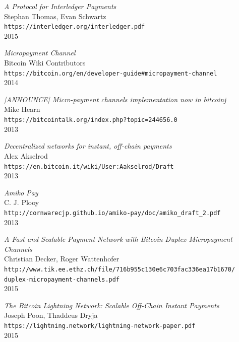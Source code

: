 \documentclass[a4paper]{article}
\begin{document}
\pagebreak

\printglossaries

\begin{thebibliography}{99}

\emph{A Protocol for Interledger Payments}\\
Stephan Thomas, Evan Schwartz\\
\texttt{https://interledger.org/interledger.pdf}\\
2015

\emph{Micropayment Channel}\\
Bitcoin Wiki Contributors\\
\texttt{https://bitcoin.org/en/developer-guide\#micropayment-channel}\\
2014

\emph{[ANNOUNCE] Micro-payment channels implementation now in bitcoinj}\\
Mike Hearn\\
\texttt{https://bitcointalk.org/index.php?topic=244656.0}\\
2013

\emph{Decentralized networks for instant, off-chain payments}\\
Alex Akselrod\\
\texttt{https://en.bitcoin.it/wiki/User:Aakselrod/Draft}\\
2013

\emph{Amiko Pay}\\
C. J. Plooy\\
\texttt{http://cornwarecjp.github.io/amiko-pay/doc/amiko\_draft\_2.pdf}\\
2013

\emph{A Fast and Scalable Payment Network with Bitcoin Duplex Micropayment Channels}\\
Christian Decker, Roger Wattenhofer\\
\texttt{http://www.tik.ee.ethz.ch/file/716b955c130e6c703fac336ea17b1670/\\duplex-micropayment-channels.pdf}\\
2015

\emph{The Bitcoin Lightning Network: Scalable Off-Chain Instant Payments}\\
Joseph Poon, Thaddeus Dryja\\
\texttt{https://lightning.network/lightning-network-paper.pdf}\\
2015


\end{thebibliography}
\end{document}
